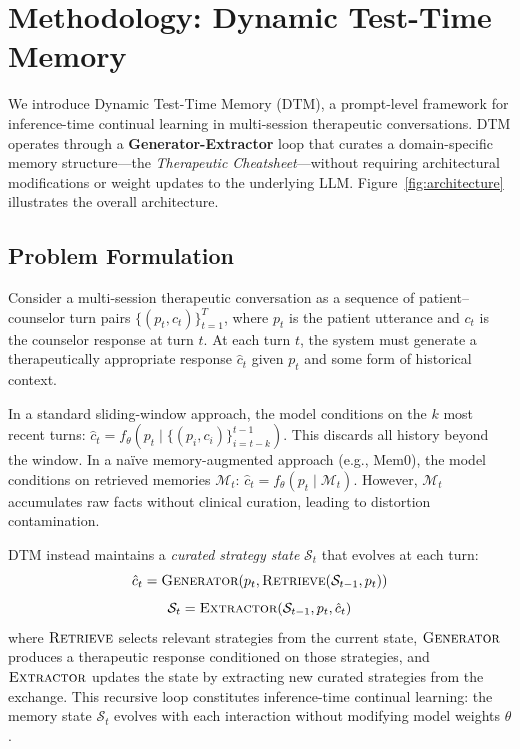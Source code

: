 \section{Methodology: Dynamic Test-Time Memory}

We introduce Dynamic Test-Time Memory (DTM), a prompt-level framework for inference-time continual learning in multi-session therapeutic conversations. DTM operates through a \textbf{Generator-Extractor} loop that curates a domain-specific memory structure---the \emph{Therapeutic Cheatsheet}---without requiring architectural modifications or weight updates to the underlying LLM. Figure~\ref{fig:architecture} illustrates the overall architecture.

\subsection{Problem Formulation}

Consider a multi-session therapeutic conversation as a sequence of patient--counselor turn pairs $\{(p_t, c_t)\}_{t=1}^{T}$, where $p_t$ is the patient utterance and $c_t$ is the counselor response at turn $t$. At each turn $t$, the system must generate a therapeutically appropriate response $\hat{c}_t$ given $p_t$ and some form of historical context.

In a standard sliding-window approach, the model conditions on the $k$ most recent turns: $\hat{c}_t = f_\theta(p_t \mid \{(p_i, c_i)\}_{i=t-k}^{t-1})$. This discards all history beyond the window. In a na\"ive memory-augmented approach (e.g., Mem0), the model conditions on retrieved memories $\mathcal{M}_t$: $\hat{c}_t = f_\theta(p_t \mid \mathcal{M}_t)$. However, $\mathcal{M}_t$ accumulates raw facts without clinical curation, leading to distortion contamination.

DTM instead maintains a \emph{curated strategy state} $\mathcal{S}_t$ that evolves at each turn:
\begin{equation}
    \hat{c}_t = \textsc{Generator}(p_t, \textsc{Retrieve}(\mathcal{S}_{t-1}, p_t))
\end{equation}
\begin{equation}
    \mathcal{S}_t = \textsc{Extractor}(\mathcal{S}_{t-1}, p_t, \hat{c}_t)
\end{equation}
where $\textsc{Retrieve}$ selects relevant strategies from the current state, $\textsc{Generator}$ produces a therapeutic response conditioned on those strategies, and $\textsc{Extractor}$ updates the state by extracting new curated strategies from the exchange. This recursive loop constitutes inference-time continual learning: the memory state $\mathcal{S}_t$ evolves with each interaction without modifying model weights $\theta$.


